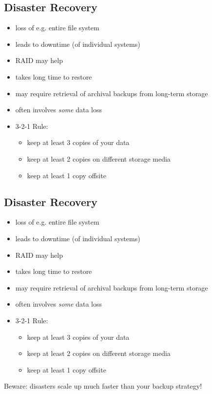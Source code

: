 \documentclass[xga]{xdvislides}
\begin{document}
\subsection{Disaster Recovery}
\begin{itemize}
	\item loss of e.g. entire file system
	\item leads to downtime (of individual systems)
	\item RAID may help
	\item takes long time to restore
	\item may require retrieval of archival backups from long-term storage 
	\item often involves {\em some} data loss
	\item 3-2-1 Rule:
		\begin{itemize}
			\item keep at least 3 copies of your data
			\item keep at least 2 copies on different storage media
			\item keep at least 1 copy offsite
		\end{itemize}
\end{itemize}

\subsection{Disaster Recovery}
\begin{itemize}
	\item loss of e.g. entire file system
	\item leads to downtime (of individual systems)
	\item RAID may help
	\item takes long time to restore
	\item may require retrieval of archival backups from long-term storage 
	\item often involves {\em some} data loss
	\item 3-2-1 Rule:
		\begin{itemize}
			\item keep at least 3 copies of your data
			\item keep at least 2 copies on different storage media
			\item keep at least 1 copy offsite
		\end{itemize}
\end{itemize}
\vspace{.5in}
Beware: disasters scale up much faster than your
backup strategy!
\end{document}
